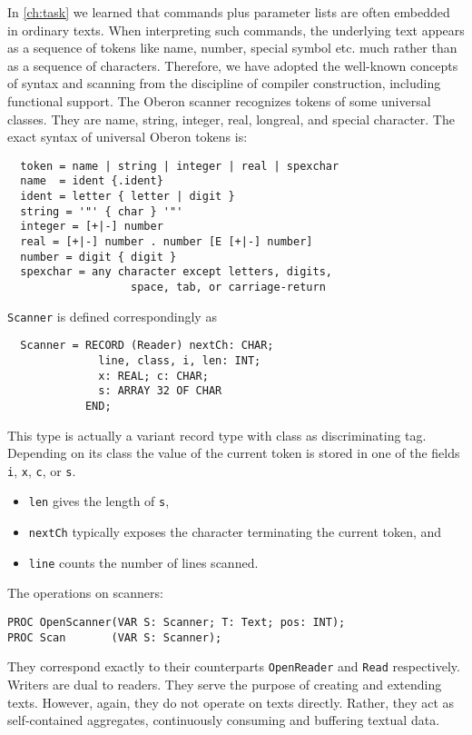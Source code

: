 In \ref{ch:task} we learned that commands plus parameter lists are often embedded in ordinary texts.
When interpreting such commands, the underlying text appears as a sequence of tokens like name,
number, special symbol etc. much rather than as a sequence of characters.  Therefore,
we have adopted the well-known concepts of syntax and scanning from the discipline
of compiler construction, including functional support.
The Oberon scanner recognizes tokens of some universal classes.
They are name, string, integer, real, longreal, and special character.
The exact syntax of universal Oberon tokens is:
\begin{verbatim}
  token = name | string | integer | real | spexchar
  name  = ident {.ident}
  ident = letter { letter | digit }
  string = '"' { char } '"'
  integer = [+|-] number
  real = [+|-] number . number [E [+|-] number]
  number = digit { digit }
  spexchar = any character except letters, digits,
                   space, tab, or carriage-return
\end{verbatim}
\verb|Scanner| is defined correspondingly as
\begin{verbatim}
  Scanner = RECORD (Reader) nextCh: CHAR;
              line, class, i, len: INT;
              x: REAL; c: CHAR;
              s: ARRAY 32 OF CHAR
            END;
\end{verbatim}
This type is actually a variant record type with class as discriminating tag.
Depending on its class the value of the current token is stored in one of the fields
\verb|i|, \verb|x|, \verb|c|, or \verb|s|.
\begin{itemize}
  \item \verb|len| gives the length of \verb|s|,
  \item \verb|nextCh| typically exposes the character terminating the current token, and
  \item \verb|line| counts the number of lines scanned.
\end{itemize}

The operations on scanners:
\begin{verbatim}
PROC OpenScanner(VAR S: Scanner; T: Text; pos: INT);
PROC Scan       (VAR S: Scanner);
\end{verbatim}

They correspond exactly to their counterparts \verb|OpenReader| and \verb|Read| respectively.
Writers are dual to readers.  They serve the purpose of creating and extending texts.
However, again, they do not operate on texts directly.  Rather,
they act as self-contained aggregates, continuously consuming and buffering textual data.

